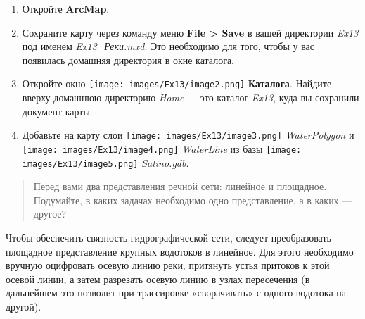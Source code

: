 \documentclass[12pt,]{book}
\begin{document}
\begin{enumerate}
\def\labelenumi{\arabic{enumi}.}
\item
  Откройте \textbf{ArcMap}.
\item
  Сохраните карту через команду меню \textbf{File \textgreater{} Save} в вашей директории \emph{Ex13} под именем \emph{Ex13\_Реки.mxd}. Это необходимо для того, чтобы у вас появилась домашняя директория в окне каталога.
\item
  Откройте окно \texttt{[image: images/Ex13/image2.png]} \textbf{Каталога}. Найдите вверху домашнюю директорию \emph{Home} --- это каталог \emph{Ex13}, куда вы сохранили документ карты.
\item
  Добавьте на карту слои \texttt{[image: images/Ex13/image3.png]} \emph{WaterPolygon} и \texttt{[image: images/Ex13/image4.png]} \emph{WaterLine} из базы \texttt{[image: images/Ex13/image5.png]} \emph{Satino.gdb}.
\end{enumerate}

\begin{quote}
Перед вами два представления речной сети: линейное и площадное. Подумайте, в каких задачах необходимо одно представление, а в каких --- другое?
\end{quote}

Чтобы обеспечить связность гидрографической сети, следует преобразовать площадное представление крупных водотоков в линейное. Для этого необходимо вручную оцифровать осевую линию реки, притянуть устья притоков к этой осевой линии, а затем разрезать осевую линию в узлах пересечения (в дальнейшем это позволит при трассировке «сворачивать» с одного водотока на другой).
\end{document}
